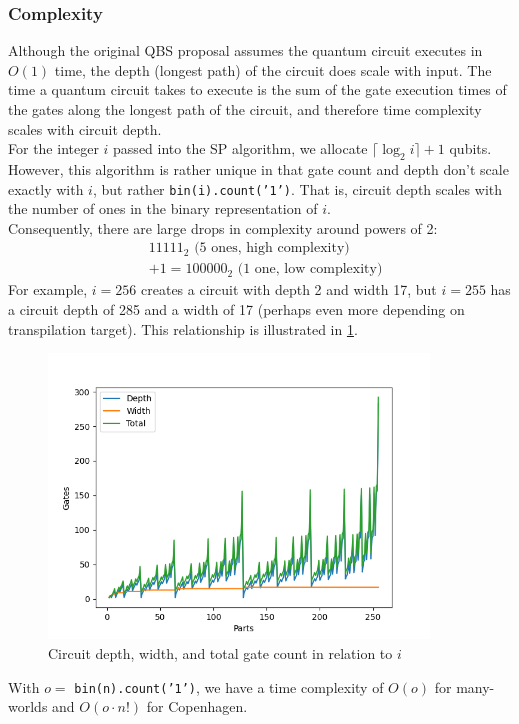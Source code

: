 \documentclass[12pt]{article}
\begin{document}
\subsubsection{Complexity}
Although the original QBS proposal assumes the quantum circuit executes in $O(1)$ time, the depth (longest path) of the circuit does scale with input. The time a quantum circuit takes to execute is the sum of the gate execution times of the gates along the longest path of the circuit, and therefore time complexity scales with circuit depth. \\
For the integer $i$ passed into the SP algorithm, we allocate $\lceil \log_2 i \rceil + 1$ qubits. However, this algorithm is rather unique in that gate count and depth don't scale exactly with $i$, but rather \texttt{bin(i).count('1')}. That is, circuit depth scales with the number of ones in the binary representation of $i$. \\
\indent Consequently, there are large drops in complexity around powers of 2:
\begin{align*}
&11111_2 \text{  (5 ones, high complexity)} \\ &+ 1 = 100000_2 \text{  (1 one, low complexity)}
\end{align*}
For example, $i = 256$ creates a circuit with depth 2 and width 17, but $i = 255$ has a circuit depth of 285 and a width of 17 (perhaps even more depending on transpilation target). This relationship is illustrated in \ref{fig:resources}.

\begin{figure}[h]
    \centering
    \capstart
    \includegraphics[width=0.9\textwidth]{images/resources.png}
    \caption{Circuit depth, width, and total gate count in relation to $i$}
    \label{fig:resources}
\end{figure}
\vspace{10mm}
\noindent With $o = $ \texttt{bin(n).count('1')}, we have a time complexity of $O(o)$ for many-worlds and $O(o \cdot n!)$ for Copenhagen.
\end{document}
